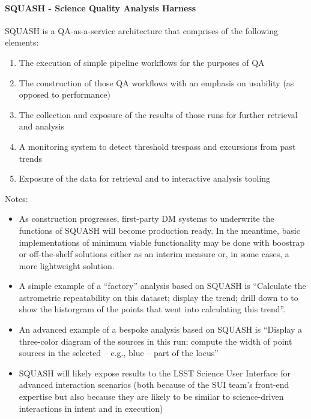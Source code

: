 \paragraph{SQUASH - Science Quality Analysis Harness}
\label{sec:qaSquash}

SQUASH is a QA-as-a-service architecture that comprises of the
following elements:

\begin{enumerate}
\item The execution of simple pipeline workflows for the purposes of QA

\item The construction of those QA workflows with an emphasis on usability (as opposed to performance)

\item The collection and exposure of the results of those runs for further retrieval and analysis

\item A monitoring system to detect threshold trespass and excursions from past trends

\item Exposure of the data for retrieval and to interactive analysis tooling

\end{enumerate}


Notes:

\begin{itemize}

\item As construction progresses, first-party DM systems to underwrite the functions of SQUASH will become production ready. In the meantime, basic implementations of minimum viable functionality may be done with boostrap or off-the-shelf solutions either as an interim measure or, in some cases, a more lightweight solution.

\item A simple example of a ``factory'' analysis based on SQUASH is ``Calculate the astrometric repeatability on this dataset; display the trend; drill down to to show the historgram of the points that went into calculating this trend''.

\item An advanced example of a bespoke analysis based on SQUASH is “Display a three-color diagram of the sources in this run; compute the width of point sources in the selected -- e.g., blue -- part of the locus''

\item SQUASH will likely expose results to the LSST Science User Interface for advanced interaction scenarios (both because of the SUI team's front-end expertise but also because they are likely to be similar to science-driven interactions in intent and in execution)

\end{itemize}

